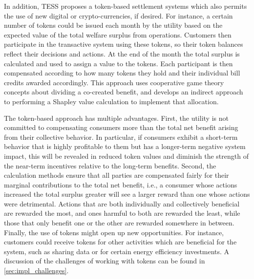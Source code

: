 In addition, TESS proposes a token-based settlement systems which also permits the use of new digital or crypto-currencies, if desired.
For instance, a certain number of tokens could be issued each month by the utility based on the expected value of the total welfare surplus from operations. Customers then participate in the transactive system using these tokens, so their token balances reflect their decisions and actions. At the end of the month the total surplus is calculated and used to assign a value to the tokens. Each participant is then compensated according to how many tokens they hold and their individual bill credits awarded accordingly. This approach uses cooperative game theory concepts about dividing a co-created benefit, and develops an indirect approach to performing a Shapley value calculation to implement that allocation.

The token-based approach has multiple advantages. 
First, the utility is not committed to compensating consumers more than the total net benefit arising from their collective behavior. In particular, if consumers exhibit a short-term behavior that is highly profitable to them but has a longer-term negative system impact, this will be revealed in reduced token values and diminish the strength of the near-term incentives relative to the long-term benefits.  
Second, the calculation methods ensure that all parties are compensated fairly for their marginal contributions to the total net benefit, i.e., a consumer whose actions increased the total surplus greater will see a larger reward than one whose actions were detrimental. Actions that are both individually and collectively beneficial are rewarded the most, and ones harmful to both are rewarded the least, while those that only benefit one or the other are rewarded somewhere in between.  
Finally, the use of tokens might open up new opportunities. For instance, customers could receive tokens for other activities which are beneficial for the system, such as sharing data or for certain energy efficiency investments.
A discussion of the challenges of working with tokens can be found in \cref{sec:impl_challenges}.




